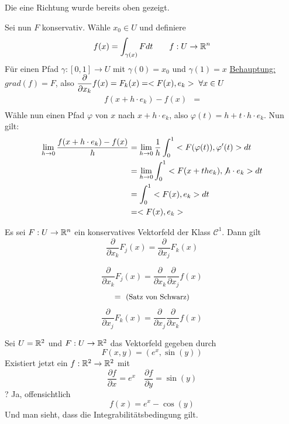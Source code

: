 \documentclass[main.tex]{subfiles}
\begin{document}
\begin{Beweis}
  Die eine Richtung wurde bereits oben gezeigt.

  Sei nun $F$ konservativ. Wähle $x_0 \in U$ und definiere
  $$f(x) = \int_{\gamma (x)} F dt \qquad f:U\to \mathbb{R}^n$$
  Für einen Pfad $\gamma:[0,1] \to U$ mit $\gamma(0) = x_0$ und $\gamma(1) = x$
  \underline{Behauptung:} $grad(f) = F$, also $\dfrac{\partial}{\partial x_k} f(x) = F_k(x) = <F(x),e_k> \;\forall x \in U$
  $$\begin{aligned}
    f(x + h \cdot e_k) - f(x) & = \\
  \end{aligned}$$
  Wähle nun einen Pfad $\varphi$ von $x$ nach $x + h \cdot e_k$, also $\varphi(t) = h + t \cdot h \cdot e_k$.
  Nun gilt:
  $$\begin{aligned}
    \lim \limits_{h \to 0} \dfrac{f(x + h \cdot e_k) - f(x)}{h} & = \lim \limits_{h \to 0} \dfrac{1}{h} \int_0^1 <F(\varphi(t)),\varphi'(t)> dt \\
    & = \lim \limits_{h \to 0} \int_0^1 <F(x + th e_k),\not h \cdot e_k> dt \\
    & = \int_0^1 <F(x),e_k> dt \\
    & = <F(x),e_k>
  \end{aligned}$$
\end{Beweis}

\begin{Korollar}[Integrabilitätsbedingung]
  Es sei $F : U \to \mathbb{R}^n$ ein konservatives Vektorfeld der Klass $\mathcal{C}^1$. Dann gilt
  $$\dfrac{\partial}{\partial x_k} F_j(x) = \dfrac{\partial}{\partial x_j} F_k(x)$$
\end{Korollar}
\begin{Beweis}
$$\dfrac{\partial}{\partial x_k} F_j(x)  = \dfrac{\partial}{\partial x_k} \dfrac{\partial}{\partial x_j} f(x)$$
$$= \text{ \small (Satz von Schwarz)}$$
$$\dfrac{\partial}{\partial x_j} F_k(x)  = \dfrac{\partial}{\partial x_j} \dfrac{\partial}{\partial x_k} f(x)$$
\end{Beweis}

\begin{Beispiel}
  Sei $U = \mathbb{R}^2$ und $F : U \to \mathbb{R}^2$ das Vektorfeld gegeben durch
  $$F(x,y) = (e^x, \sin(y))$$
  Existiert jetzt ein $f: \mathbb{R}^2 \to \mathbb{R}^2$ mit
  $$\dfrac{\partial f}{\partial x} = e^x \quad \dfrac{\partial f}{\partial y} = \sin(y)$$
  ? Ja, offensichtlich
  $$f(x) = e^x - \cos(y)$$
  Und man sieht, dass die Integrabilitätsbedingung gilt.
\end{Beispiel}
\end{document}
